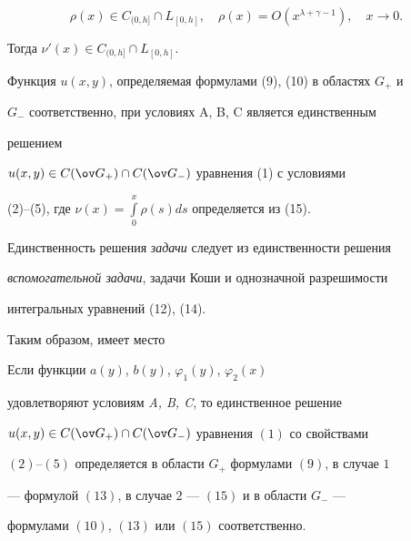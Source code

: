 $$ 


\rho(x)\in C_{(0,h]}\cap L_{[0,h]},\quad 


\rho(x)=O(x^{\lambda+\gamma-1}),\quad x\to0. 


$$ 


Тогда $\nu'(x)\in C_{(0,h]}\cap L_{[0,h]}$. 


 


Функция $u(x,y)$, определяемая формулами (9), (10) в областях $G_+$ и 


$G_-$ соответственно, при условиях A, B, C является единственным 


решением 


$u(x,y)\in C(\ov G_+)\cap C(\ov G_-)$ уравнения (1) с условиями 


(2)--(5), где $\nu(x)=\int\limits^x_0\rho(s)ds$ определяется из (15). 


 


Единственность решения {\it задачи} следует из единственности решения 


{\it вспомогательной задачи}, задачи Коши и однозначной разрешимости 


интегральных уравнений (12), (14). 


 


Таким образом, имеет место 


 


\begin{thmnonum} 


Если функции $a(y)$, $b(y)$, $\varphi_1(y)$, $\varphi_2(x)$ 


удовлетворяют условиям {\em A, B, C}, то единственное решение 


$u(x,y)\in C(\ov G_+)\cap C(\ov G_-)$ уравнения $(1)$ со свойствами 


$(2)$--$(5)$ определяется в области $G_+$ формулами $(9)$, в случае $1$ 


--- формулой $(13)$, в случае $2$ --- $(15)$ и в области $G_-$ --- 


формулами $(10)$, $(13)$ или $(15)$ соответственно. 


\end{thmnonum} 


 


